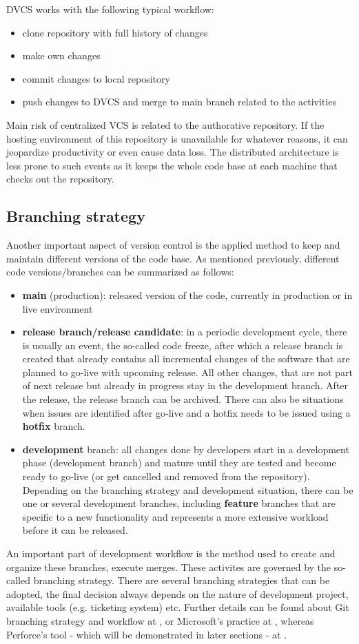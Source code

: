 DVCS works with the following typical workflow:
\begin{itemize}
    \item clone repository with full history of changes
    \item make own changes
    \item commit changes to local repository
    \item push changes to DVCS and merge to main branch related to the activities
\end{itemize}
Main risk of centralized VCS is related to the authorative repository. If the hosting environment of this repository is
unavailable for whatever reasons, it can jeopardize productivity or even cause data loss. The distributed architecture
is less prone to such events as it keeps the whole code base at each machine that checks out the repository.
\subsection{Branching strategy}
Another important aspect of version control is the applied method to keep and maintain different versions of the code base.
As mentioned previously, different code versions/branches can be summarized as follows:
\begin{itemize}
    \item \textbf{main} (production): released version of the code, currently in production or in live environment
    \item \textbf{release branch/release candidate}: in a periodic development cycle, there is usually an event, the so-called 
    code freeze, after which a release branch is created that already contains all incremental changes of the software 
    that are planned to go-live with upcoming release. All other changes, that are not part of next release but already
    in progress stay in the development branch. After the release, the release branch can be archived. There can also
    be situations when issues are identified after go-live and a hotfix needs to be issued using a \textbf{hotfix} branch.
    \item \textbf{development} branch: all changes done by developers start in a development phase (development branch) 
    and mature until they are tested and become ready to go-live (or get cancelled and removed from the repository).
    Depending on the branching strategy and development situation, there can be one or several development branches,
    including \textbf{feature} branches that are specific to a new functionality and represents a more extensive workload before
    it can be released.
\end{itemize}
An important part of development workflow is the method used to create and organize these branches, execute merges. These
activites are governed by the so-called branching strategy. There are several branching strategies that can be adopted,
the final decision always depends on the nature of development project, available tools (e.g. ticketing system) etc.
Further details can be found about Git branching strategy and workflow at \cite{gitflow-workflow}, or Microsoft's
practice at \cite{ms-tfs-branching}, whereas Perforce's tool - which will be demonstrated in later sections - at 
\cite{perforce-branching}. %
